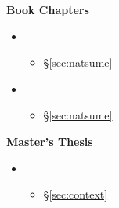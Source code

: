 \textbf{Book Chapters}
\begin{itemize}
  \item {}
  \begin{itemize}
    \item \S\ref{sec:natsume}
  \end{itemize}
  \item {}
  \begin{itemize}
    \item \S\ref{sec:natsume}
  \end{itemize}
\end{itemize}

\textbf{Master's Thesis}
\begin{itemize}
  \item {}
  \begin{itemize}
    \item \S\ref{sec:context}
  \end{itemize}
\end{itemize}
